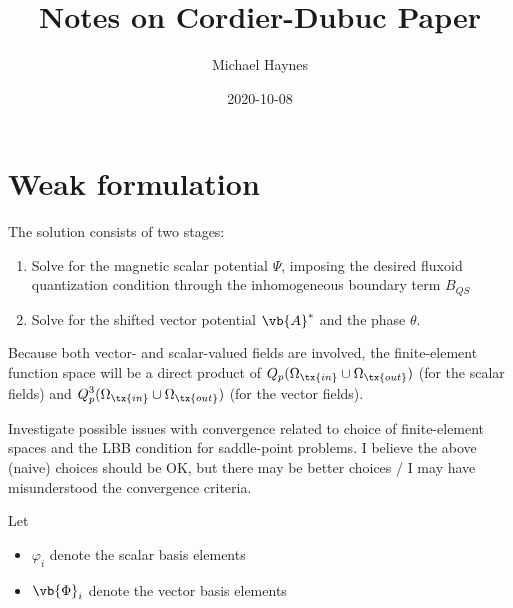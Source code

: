 \documentclass{pset}
\begin{document}
\author{Michael Haynes}
\title{Notes on Cordier-Dubuc Paper}
\date{2020-10-08}
\maketitle
\section{Weak formulation}

The solution consists of two stages:
\begin{enumerate}[label=(\Alph*)]
  \item Solve for the magnetic scalar potential $\displaystyle \Psi$, imposing the desired fluxoid quantization condition through the inhomogeneous boundary term $\displaystyle B_{QS}$ \label{first-part}
  \item Solve for the shifted vector potential $\displaystyle \vb{A}^{*}$ and the phase $\displaystyle \theta$. \label{second-part}
\end{enumerate}

Because both vector- and scalar-valued fields are involved, the finite-element function space will be a direct product of $\displaystyle Q_p(\Omega_{\tx{in}} \cup \Omega_{\tx{out}})$ (for the scalar fields) and $\displaystyle Q_p^{3}(\Omega_{\tx{in}} \cup \Omega_{\tx{out}})$ (for the vector fields).

\begin{todo}
  Investigate possible issues with convergence related to choice of finite-element spaces and the LBB condition for saddle-point problems.  I believe the above (naive) choices should be OK, but there may be better choices / I may have misunderstood the convergence criteria.
\end{todo}


\begin{definition*} \label{defn:basis-functions}
  Let 
  \begin{itemize}
    \item $\displaystyle \varphi_i$ denote the scalar basis elements
    \item $\displaystyle \vb{\Phi}_i$ denote the vector basis elements
  \end{itemize}
\end{definition*}
\end{document}
